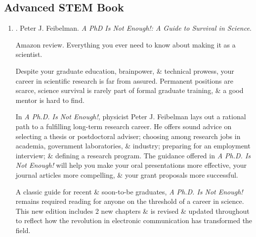 \documentclass{article}
\begin{document}

\subsection{Advanced STEM Book}

\begin{enumerate}
	\item \cite{Feibelman2011}. {\sc Peter J. Feibelman}. {\it A PhD Is Not Enough!: A Guide to Survival in Science}. {}
	
	{\sf Amazon review.} Everything you ever need to know about making it as a scientist.
	
	Despite your graduate education, brainpower, \& technical prowess, your career in scientific research is far from assured. Permanent positions are scarce, science survival is rarely part of formal graduate training, \& a good mentor is hard to find.
	
	In {\it A Ph.D. Is Not Enough!}, physicist {\sc Peter J. Feibelman} lays out a rational path to a fulfilling long-term research career. He offers sound advice on selecting a thesis or postdoctoral adviser; choosing among research jobs in academia, government laboratories, \& industry; preparing for an employment interview; \& defining a research program. The guidance offered in {\it A Ph.D. Is Not Enough!} will help you make your oral presentations more effective, your journal articles more compelling, \& your grant proposals more successful.
	
	A classic guide for recent \& soon-to-be graduates, {\it A Ph.D. Is Not Enough!} remains required reading for anyone on the threshold of a career in science. This new edition includes 2 new chapters \& is revised \& updated throughout to reflect how the revolution in electronic communication has transformed the field.
	

\end{enumerate}
\end{document}
